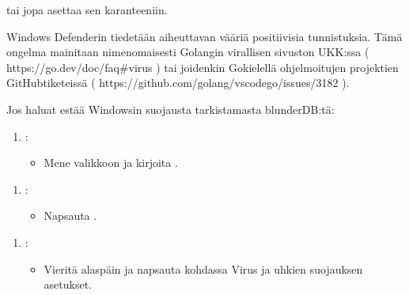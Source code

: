 \documentclass[letterpaper,10pt,finnish]{sphinxmanual}
\begin{document}
\begin{figure}[htbp]
\centering

\noindent{}
\end{figure}

\sphinxAtStartPar
tai jopa asettaa sen karanteeniin.

\sphinxAtStartPar
Windows Defenderin tiedetään aiheuttavan vääriä positiivisia tunnistuksia. Tämä ongelma mainitaan nimenomaisesti Golangin virallisen sivuston UKK:ssa ( https://go.dev/doc/faq\#virus ) tai joidenkin Go\sphinxhyphen{}kielellä ohjelmoitujen projektien GitHub\sphinxhyphen{}tiketeissä ( https://github.com/golang/vscode\sphinxhyphen{}go/issues/3182 ).

\sphinxAtStartPar
Jos haluat estää Windowsin suojausta tarkistamasta blunderDB:tä:
\begin{enumerate}
%
\item {} 
\sphinxAtStartPar
{}:
\begin{itemize}
\item {} 
\sphinxAtStartPar
Mene \sphinxhyphen{}valikkoon ja kirjoita .

\end{itemize}

\end{enumerate}

\begin{figure}[htbp]
\centering

\noindent{}
\end{figure}
\begin{enumerate}
%
\setcounter{enumi}{1}
\item {} 
\sphinxAtStartPar
{}:
\begin{itemize}
\item {} 
\sphinxAtStartPar
Napsauta .

\end{itemize}

\end{enumerate}

\begin{figure}[htbp]
\centering

\noindent{}
\end{figure}
\begin{enumerate}
%
\setcounter{enumi}{2}
\item {} 
\sphinxAtStartPar
{}:
\begin{itemize}
\item {} 
\sphinxAtStartPar
Vieritä alaspäin ja napsauta  kohdassa Virus\sphinxhyphen{} ja uhkien suojauksen asetukset.

\end{itemize}

\end{enumerate}
\end{document}
